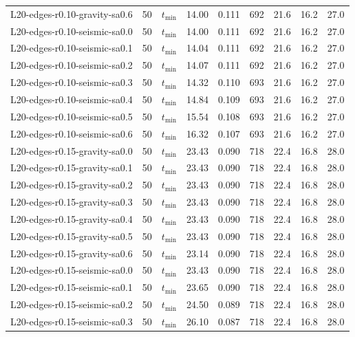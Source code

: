 \begin{longtable}{lrlrrrrrr}
L20-edges-r0.10-gravity-sa0.6 & 50 & $t_{\mathrm{min}}$ & 14.00 & 0.111 & 692 & 21.6 & 16.2 & 27.0 \\
L20-edges-r0.10-seismic-sa0.0 & 50 & $t_{\mathrm{min}}$ & 14.00 & 0.111 & 692 & 21.6 & 16.2 & 27.0 \\
L20-edges-r0.10-seismic-sa0.1 & 50 & $t_{\mathrm{min}}$ & 14.04 & 0.111 & 692 & 21.6 & 16.2 & 27.0 \\
L20-edges-r0.10-seismic-sa0.2 & 50 & $t_{\mathrm{min}}$ & 14.07 & 0.111 & 692 & 21.6 & 16.2 & 27.0 \\
L20-edges-r0.10-seismic-sa0.3 & 50 & $t_{\mathrm{min}}$ & 14.32 & 0.110 & 693 & 21.6 & 16.2 & 27.0 \\
L20-edges-r0.10-seismic-sa0.4 & 50 & $t_{\mathrm{min}}$ & 14.84 & 0.109 & 693 & 21.6 & 16.2 & 27.0 \\
L20-edges-r0.10-seismic-sa0.5 & 50 & $t_{\mathrm{min}}$ & 15.54 & 0.108 & 693 & 21.6 & 16.2 & 27.0 \\
L20-edges-r0.10-seismic-sa0.6 & 50 & $t_{\mathrm{min}}$ & 16.32 & 0.107 & 693 & 21.6 & 16.2 & 27.0 \\
L20-edges-r0.15-gravity-sa0.0 & 50 & $t_{\mathrm{min}}$ & 23.43 & 0.090 & 718 & 22.4 & 16.8 & 28.0 \\
L20-edges-r0.15-gravity-sa0.1 & 50 & $t_{\mathrm{min}}$ & 23.43 & 0.090 & 718 & 22.4 & 16.8 & 28.0 \\
L20-edges-r0.15-gravity-sa0.2 & 50 & $t_{\mathrm{min}}$ & 23.43 & 0.090 & 718 & 22.4 & 16.8 & 28.0 \\
L20-edges-r0.15-gravity-sa0.3 & 50 & $t_{\mathrm{min}}$ & 23.43 & 0.090 & 718 & 22.4 & 16.8 & 28.0 \\
L20-edges-r0.15-gravity-sa0.4 & 50 & $t_{\mathrm{min}}$ & 23.43 & 0.090 & 718 & 22.4 & 16.8 & 28.0 \\
L20-edges-r0.15-gravity-sa0.5 & 50 & $t_{\mathrm{min}}$ & 23.43 & 0.090 & 718 & 22.4 & 16.8 & 28.0 \\
L20-edges-r0.15-gravity-sa0.6 & 50 & $t_{\mathrm{min}}$ & 23.14 & 0.090 & 718 & 22.4 & 16.8 & 28.0 \\
L20-edges-r0.15-seismic-sa0.0 & 50 & $t_{\mathrm{min}}$ & 23.43 & 0.090 & 718 & 22.4 & 16.8 & 28.0 \\
L20-edges-r0.15-seismic-sa0.1 & 50 & $t_{\mathrm{min}}$ & 23.65 & 0.090 & 718 & 22.4 & 16.8 & 28.0 \\
L20-edges-r0.15-seismic-sa0.2 & 50 & $t_{\mathrm{min}}$ & 24.50 & 0.089 & 718 & 22.4 & 16.8 & 28.0 \\
L20-edges-r0.15-seismic-sa0.3 & 50 & $t_{\mathrm{min}}$ & 26.10 & 0.087 & 718 & 22.4 & 16.8 & 28.0 \\

\end{longtable}

